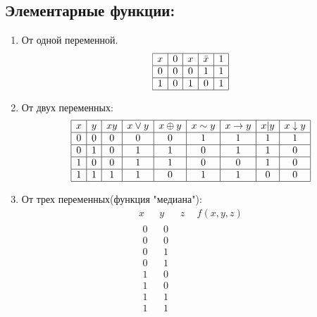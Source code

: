 \subsection{Элементарные функции:} 
\begin{enumerate}
	\item От одной переменной.
	$$
    \begin{array}{|c|c|c|c|c|}
    \hline
    x & 0 & x & \bar{x} & 1 \\
    \hline
    0 & 0 & 0 & 1 & 1 \\
    \hline
    1 & 0 & 1 & 0 & 1 \\
    \hline
    \end{array}
    $$
    \item От двух переменных:
    $$
    \begin{array}{|c|c|c|c|c|c|c|c|c|c|}
	\hline
	 x & y & xy & x\vee y & x\oplus y & x\sim y & x\rightarrow y & x|y & x\downarrow y\\
	\hline
	 0 & 0 & 0 & 0 & 0 & 1 &  1 & 1 & 1 \\
	\hline
	 0 & 1 & 0 & 1 & 1 & 0 &  1 & 1 & 0 \\
	\hline
	 1 & 0 & 0 & 1 & 1 & 0 &  0 & 1 & 0  \\
	\hline
	 1 & 1 & 1 & 1 & 0 & 1 &  1 & 0 & 0 \\
	\hline
	\end{array}
	$$
	\item
	От трех переменных(функция "медиана"):
	$$
	\begin{array}{rrr|c}
	x~~ & y~~ & z~~ & f(x,y,z)\\
	\hline
	\begin{array}{r} %
	0\\ 0\\ 0\\ 0\\ 1\\ 1\\ 1\\ 1\\
	\end{array}
	&
	\begin{array}{r}
	0\\ 0\\ 1\\ 1\\ 0\\ 0\\ 1\\ 1\\
	\end{array}

\end{array}$$
\end{enumerate}
